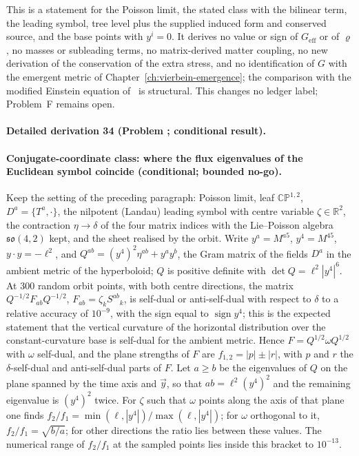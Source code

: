 This is a statement for the Poisson limit, the stated class with the bilinear term, the leading symbol, tree level plus the supplied induced form and conserved source, and the base points with \(y^i=0\). It derives no value or sign of \(G_{\mathrm{eff}}\) or of \(\varrho\), no masses or subleading terms, no matrix-derived matter coupling, no new derivation of the conservation of the extra stress, and no identification of \(G\) with the emergent metric of Chapter~\ref{ch:vierbein-emergence}; the comparison with the modified Einstein equation of~\cite{KumarSteinacker2023,Steinacker2026} is structural. This changes no ledger label; Problem~F remains open.



\paragraph{Detailed derivation 34 (Problem ; conditional result).} \label{ref:detail-33} %



\paragraph{Conjugate-coordinate class: where the flux eigenvalues of the Euclidean symbol coincide (conditional; bounded no-go).}

Keep the setting of the preceding paragraph: Poisson limit, leaf \(\mathbb{CP}^{1,2}\), \(D^a=\{T^a,\cdot\}\), the nilpotent (Landau) leading symbol with centre variable \(\zeta\in\mathbb R^2\), the contraction \(\eta\to\delta\) of the four matrix indices with the Lie--Poisson algebra \(\mathfrak{so}(4,2)\) kept, and the sheet realised by the orbit. Write \(y^a=M^{a5}\), \(y^4=M^{45}\), \(y\cdot y=-\ell^2\), and \(Q^{ab}=(y^4)^2\eta^{ab}+y^ay^b\), the Gram matrix of the fields \(D^a\) in the ambient metric of the hyperboloid; \(Q\) is positive definite with \(\det Q=\ell^2|y^4|^6\). At \(300\) random orbit points, with both centre directions, the matrix \(Q^{-1/2}F_{ab}Q^{-1/2}\), \(F_{ab}=\zeta_kS^{ab}{}_k\), is self-dual or anti-self-dual with respect to \(\delta\) to a relative accuracy of \(10^{-9}\), with the sign equal to \(\operatorname{sign}y^4\); this is the expected statement that the vertical curvature of the horizontal distribution over the constant-curvature base is self-dual for the ambient metric. Hence \(F=Q^{1/2}\omega Q^{1/2}\) with \(\omega\) self-dual, and the plane strengths of \(F\) are \(f_{1,2}=|p|\pm|r|\), with \(p\) and \(r\) the \(\delta\)-self-dual and anti-self-dual parts of \(F\). Let \(a\ge b\) be the eigenvalues of \(Q\) on the plane spanned by the time axis and \(\vec y\), so that \(ab=\ell^2(y^4)^2\) and the remaining eigenvalue is \((y^4)^2\) twice. For \(\zeta\) such that \(\omega\) points along the axis of that plane one finds \(f_2/f_1=\min(\ell,|y^4|)/\max(\ell,|y^4|)\); for \(\omega\) orthogonal to it, \(f_2/f_1=\sqrt{b/a}\); for other directions the ratio lies between these values. The numerical range of \(f_2/f_1\) at the sampled points lies inside this bracket to \(10^{-13}\).



